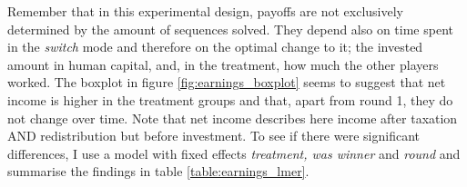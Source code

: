 \begin{table}[!htbp] \centering 
  \caption{Linear Mixed Model - Sequence Production} 
  \label{table:lmer_prod} 
\end{table} 

Remember that in this experimental design, payoffs are not exclusively determined by the amount of sequences solved. They depend also on time spent in the \textit{switch} mode and therefore on the optimal change to it; the invested amount in human capital, and, in the treatment, how much the other players worked. The boxplot in figure \ref{fig:earnings_boxplot} seems to suggest that net income is higher in the treatment groups and that, apart from round 1, they do not change over time. Note that net income describes here income after taxation AND redistribution but before investment. To see if there were significant differences, I use a model with fixed effects \textit{treatment, was winner} and \textit{round} and summarise the findings in table \ref{table:earnings_lmer}.\\

